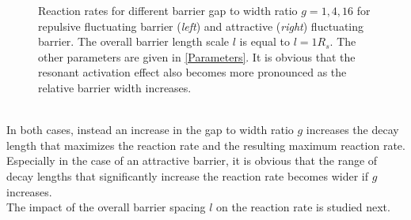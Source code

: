 \begin{minipage}[t]{1 \textwidth}
    \begin{figure}[H]
        \caption{Reaction rates for different barrier gap to width ratio $g = 1, 4 ,16$ for repulsive fluctuating barrier (\emph{left}) and attractive (\emph{right}) fluctuating barrier. The overall barrier length scale $l$ is equal to $l=1 R_s$. The other parameters are given in \ref{Parameters}. It is obvious that the resonant activation effect also becomes more pronounced as the relative barrier width increases.\label{fig:var_g}}
    \end{figure}
\end{minipage} \vspace{0.5 cm} \\

In both cases, instead an increase in the gap to width ratio $g$ increases the decay length that maximizes the reaction rate and the resulting maximum reaction rate. Especially in the case of an attractive barrier, it is obvious that the range of decay lengths that significantly increase the reaction rate becomes wider if $g$ increases. \\
The impact of the overall barrier spacing $l$ on the reaction rate is studied next.
